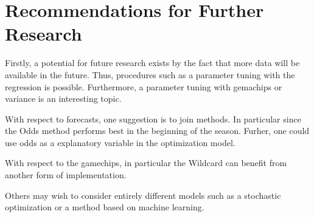 
\chapter{Recommendations for Further Research}

Firstly, a potential for future research exists by the fact that more data will be available in the future. Thus, procedures such as a parameter tuning with the regression is possible. Furthermore, a parameter tuning with gemachips or variance is an interesting topic.

\newpar

With respect to forecasts, one suggestion is to join methods. In particular since the Odds method performs best in the beginning of the season. Furher, one could use odds as a explanatory variable in the optimization model.

\newpar

With respect to the gamechips, in particular the Wildcard can benefit from another form of implementation.

\newpar

Others may wish to consider entirely different models such as a stochastic optimization or a method based on machine learning.